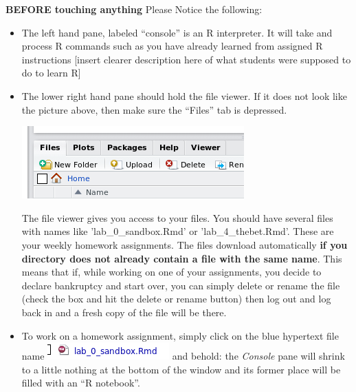 \documentclass[11pt]{article}
\begin{document}
\textbf{BEFORE touching anything} Please Notice the following:

\begin{itemize}
\item The left hand pane, labeled ``console''  is an R interpreter.  It will take and process R commands such as you have already learned from assigned R instructions [insert clearer description here of what students were supposed to do to learn R]

\item The lower right hand pane should hold the file viewer. If it does not look like the picture above, then make sure the ``Files'' tab is depressed.

\includegraphics[scale=.5]{RstudioFiles}

The file viewer gives you access to your files.  You should have several files with names like 'lab\_0\_sandbox.Rmd' or 'lab\_4\_thebet.Rmd'.   These are your weekly homework assignments.  The files download automatically \textbf{if you directory does not already contain a file with the same name}.  This means that if, while working on one of your assignments, you decide to declare bankruptcy and start over, you can simply delete or rename the file (check the box and hit the delete or rename button) then log out and log back in and a fresh copy of the file will be there.

\item To work on a homework assignment, simply click on the blue hypertext file name
\includegraphics[scale=.5]{RstudioHyplink} and behold:  the \emph{Console} pane will shrink to a little nothing at the bottom of the window and its former place will be filled with an ``R notebook''.


\end{itemize}
\end{document}
